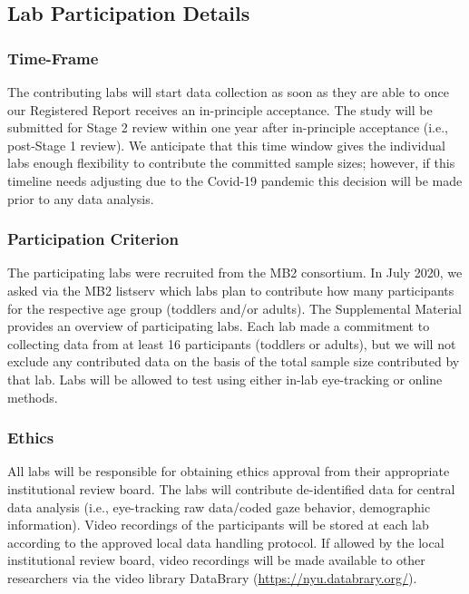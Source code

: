 \documentclass[
  english,
  man,floatsintext]{apa6}
\begin{document}
\hypertarget{lab-participation-details}{%
\subsection{Lab Participation Details}\label{lab-participation-details}}

\hypertarget{time-frame}{%
\subsubsection{Time-Frame}\label{time-frame}}

The contributing labs will start data collection as soon as they are able to once our Registered Report receives an in-principle acceptance. The study will be submitted for Stage 2 review within one year after in-principle acceptance (i.e., post-Stage 1 review). We anticipate that this time window gives the individual labs enough flexibility to contribute the committed sample sizes; however, if this timeline needs adjusting due to the Covid-19 pandemic this decision will be made prior to any data analysis.

\hypertarget{participation-criterion}{%
\subsubsection{Participation Criterion}\label{participation-criterion}}

The participating labs were recruited from the MB2 consortium. In July 2020, we asked via the MB2 listserv which labs plan to contribute how many participants for the respective age group (toddlers and/or adults). The Supplemental Material provides an overview of participating labs. Each lab made a commitment to collecting data from at least 16 participants (toddlers or adults), but we will not exclude any contributed data on the basis of the total sample size contributed by that lab. Labs will be allowed to test using either in-lab eye-tracking or online methods.

\hypertarget{ethics}{%
\subsubsection{Ethics}\label{ethics}}

All labs will be responsible for obtaining ethics approval from their appropriate institutional review board. The labs will contribute de-identified data for central data analysis (i.e., eye-tracking raw data/coded gaze behavior, demographic information). Video recordings of the participants will be stored at each lab according to the approved local data handling protocol. If allowed by the local institutional review board, video recordings will be made available to other researchers via the video library DataBrary (\url{https://nyu.databrary.org/}).
\end{document}

